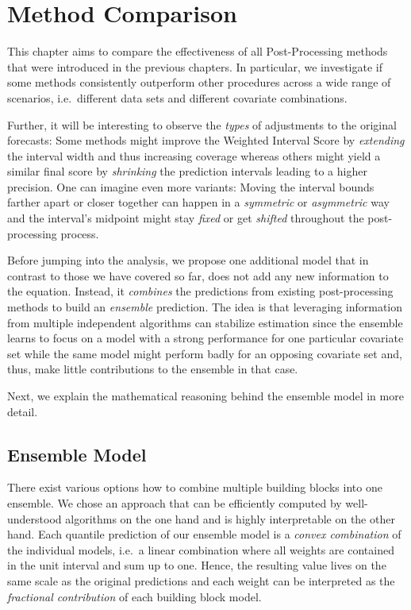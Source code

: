 \documentclass[
]{article}
\begin{document}
\newpage

\hypertarget{comparison}{%
\section{Method Comparison}\label{comparison}}

This chapter aims to compare the effectiveness of all Post-Processing methods that were introduced in the previous chapters.
In particular, we investigate if some methods consistently outperform other procedures across a wide range of scenarios, i.e.~different data sets and different covariate combinations.

Further, it will be interesting to observe the \emph{types} of adjustments to the original forecasts:
Some methods might improve the Weighted Interval Score by \emph{extending} the interval width and thus increasing coverage whereas others might yield a similar final score by \emph{shrinking} the prediction intervals leading to a higher precision.
One can imagine even more variants: Moving the interval bounds farther apart or closer together can happen in a \emph{symmetric} or \emph{asymmetric} way and the interval's midpoint might stay \emph{fixed} or get \emph{shifted} throughout the post-processing process.

Before jumping into the analysis, we propose one additional model that in contrast to those we have covered so far, does not add any new information to the equation.
Instead, it \emph{combines} the predictions from existing post-processing methods to build an \emph{ensemble} prediction.
The idea is that leveraging information from multiple independent algorithms can stabilize estimation since the ensemble learns to focus on a model with a strong performance for one particular covariate set while the same model might perform badly for an opposing covariate set and, thus, make little contributions to the ensemble in that case.

Next, we explain the mathematical reasoning behind the ensemble model in more detail.

\hypertarget{ensemble-model}{%
\subsection{Ensemble Model}\label{ensemble-model}}

There exist various options how to combine multiple building blocks into one ensemble.
We chose an approach that can be efficiently computed by well-understood algorithms on the one hand and is highly interpretable on the other hand.
Each quantile prediction of our ensemble model is a \emph{convex combination} of the individual models, i.e.~a linear combination where all weights are contained in the unit interval and sum up to one.
Hence, the resulting value lives on the same scale as the original predictions and each weight can be interpreted as the \emph{fractional contribution} of each building block model.
\end{document}
